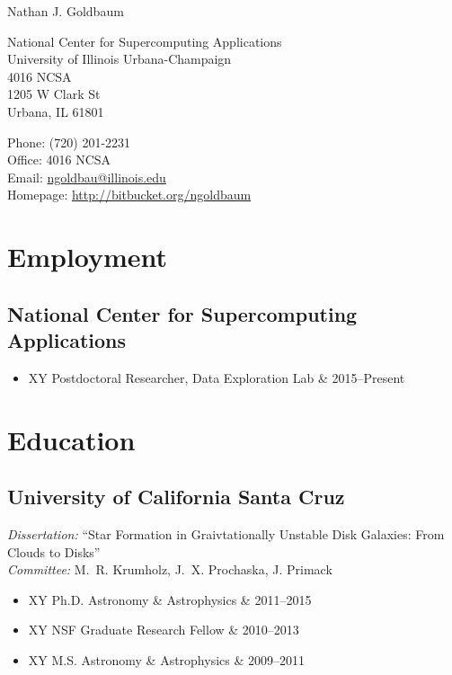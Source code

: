 \documentclass[10pt,letterpaper]{article}
\def\name{Nathan J. Goldbaum}
\newcommand{\textline}[2]{
  \begin{tabularx}{\textwidth}{XY}
  #1 & #2
  \end{tabularx}
}
\begin{document}
{\huge \name}


\bigskip

\begin{minipage}[t]{0.6\textwidth}
  National Center for Supercomputing Applications \\
  University of Illinois Urbana-Champaign \\
  4016 NCSA \\
  1205 W Clark St \\
  Urbana, IL 61801
\end{minipage}
\begin{minipage}[t]{0.4\textwidth}
  Phone: (720) 201-2231 \\
  Office: 4016 NCSA \\
  Email: \href{mailto:ngoldbau@illinois.edu}{ngoldbau@illinois.edu} \\
  Homepage: \href{https://bitbucket.org/ngoldbaum}{http://bitbucket.org/ngoldbaum}
\end{minipage}

\section*{Employment}

\subsection*{National Center for Supercomputing Applications}
  \begin{itemize}
    \item[] \textline{Postdoctoral Researcher, Data Exploration Lab}{2015--Present}
  \end{itemize}

\section*{Education}

\subsection*{University of California Santa Cruz}
\emph{Dissertation:} ``Star Formation in Graivtationally Unstable Disk
Galaxies: From Clouds to Disks''\\
\emph{Committee:} M.~R. Krumholz, J.~X. Prochaska, J. Primack
\begin{itemize}
\item[] \textline{Ph.D. Astronomy \& Astrophysics}{2011--2015}
\item[] \textline{NSF Graduate Research Fellow}{2010--2013}
\item[] \textline{M.S. Astronomy \& Astrophysics}{2009--2011}
\end{itemize}
\end{document}
